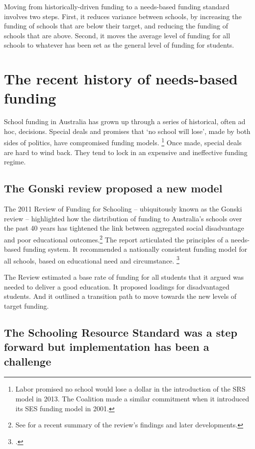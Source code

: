 \documentclass{grattan}
\begin{document}
Moving from historically-driven funding to a needs-based funding standard involves two steps.
First, it reduces variance between schools, by increasing the funding of schools that are below their target, and reducing the funding of schools that are above.
Second, it moves the average level of funding for all schools to whatever has been set as the general level of funding for students.

\section{The recent history of needs-based funding}\label{sec:politics-has-got-in-the-way-of-good-policy}

School funding in Australia has grown up through a series of historical, often ad hoc, decisions. Special deals and promises that `no school will lose', made by both sides of politics, have compromised funding models.%
\footnote{Labor promised no school would lose a dollar in the introduction of the SRS model in 2013.
The Coalition made a similar commitment when it introduced its SES funding model in 2001.}
Once made, special deals are hard to wind back.
They tend to lock in an expensive and ineffective funding regime.

\subsection{The Gonski review proposed a new model}\label{subsec:the-gonski-principles-should-be-the-goal}

The 2011 Review of Funding for Schooling -- ubiquitously known as the Gonski review -- highlighted how the distribution of funding to Australia's schools over the past 40 years has tightened the link between aggregated social disadvantage and poor educational outcomes.\footnote{See \textcite{Boston2016WhatGonskiReally} for a recent summary of the review's findings and later developments.}
The report articulated the principles of a needs-based funding system.
It recommended a nationally consistent funding model for all schools, based on educational need and circumstance.%
\footcite[][xxi]{Gonski2011ReviewFundingSchooling}

The Review estimated a base rate of funding for all students that it argued was needed to deliver a good education.
It proposed loadings for disadvantaged students.
And it outlined a transition path to move towards the new levels of target funding.

\subsection{The Schooling Resource Standard was a step forward but implementation has been a challenge}\label{subsec:the-schooling-resource-standard-was-a-stepforward-but-needs-review}
\end{document}
